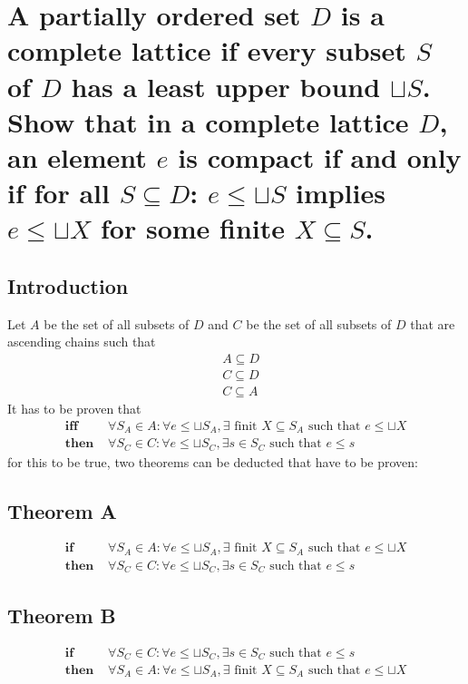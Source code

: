 \section{A partially ordered set $D$ is a complete lattice if every subset $S$ of $D$ has a least upper bound $\sqcup S$. Show that in a complete lattice $D$, an element $e$ is compact if and only if for all $S \subseteq D$: $e \leq \sqcup S$ implies $e \leq \sqcup X$ for some finite $X \subseteq S$.}
\subsection{Introduction}
Let $A$ be the set of all subsets of $D$ and $C$ be the set of all subsets of $D$ that are ascending chains such that
\begin{align}
	& A \subseteq D \\
	& C \subseteq D \\
	& C \subseteq A 			\label{eq:cola:def:ca}
\end{align}
It has to be proven that
\begin{align}
	\textbf{iff }		& \forall S_A \in A: \forall e \leq \sqcup S_A,
										\exists \text{ finit } X \subseteq S_A \text{ such that } e \leq \sqcup X \\
	\textbf{then }	& \forall S_C \in C: \forall e \leq \sqcup S_C,
										\exists s \in S_C \text{ such that } e \leq s
\end{align}
for this to be true, two theorems can be deducted that have to be proven:

\subsection{Theorem A}
\begin{align}
	\textbf{if }		& \forall S_A \in A: \forall e \leq \sqcup S_A,
										\exists \text{ finit } X \subseteq S_A \text{ such that } e \leq \sqcup X \\
	\textbf{then }	& \forall S_C \in C: \forall e \leq \sqcup S_C,
										\exists s \in S_C \text{ such that } e \leq s
\end{align}

\subsection{Theorem B}
\begin{align}
	\textbf{if }		& \forall S_C \in C: \forall e \leq \sqcup S_C,
										\exists s \in S_C \text{ such that } e \leq s \\
	\textbf{then }	& \forall S_A \in A: \forall e \leq \sqcup S_A ,
										\exists \text{ finit } X \subseteq S_A \text{ such that } e \leq \sqcup X
\end{align}


